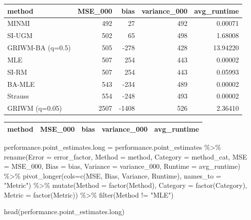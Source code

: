 \documentclass[
]{article}
\newenvironment{Shaded}{\begin{snugshade}}{\end{snugshade}}
\newcommand{\AttributeTok}[1]{\textcolor[rgb]{0.77,0.63,0.00}{#1}}
\newcommand{\FunctionTok}[1]{\textcolor[rgb]{0.00,0.00,0.00}{#1}}
\newcommand{\NormalTok}[1]{#1}
\newcommand{\OtherTok}[1]{\textcolor[rgb]{0.56,0.35,0.01}{#1}}
\newcommand{\SpecialCharTok}[1]{\textcolor[rgb]{0.00,0.00,0.00}{#1}}
\newcommand{\StringTok}[1]{\textcolor[rgb]{0.31,0.60,0.02}{#1}}
\begin{document}
\begin{tabular}{l|r|r|r|r}
\hline
method & MSE\_000 & bias & variance\_000 & avg\_runtime\\
\hline
MINMI & 492 & 27 & 492 & 0.00071\\
\hline
SI-UGM & 502 & 65 & 498 & 1.68008\\
\hline
GRIWM-BA (q=0.5) & 505 & -278 & 428 & 13.94220\\
\hline
MLE & 507 & 254 & 443 & 0.00002\\
\hline
SI-RM & 507 & 254 & 443 & 0.05993\\
\hline
BA-MLE & 543 & -234 & 489 & 0.00002\\
\hline
Strauss & 554 & -248 & 493 & 0.00002\\
\hline
GRIWM (q=0.05) & 2507 & -1408 & 526 & 2.36410\\
\hline
\end{tabular}

\begin{tabular}{l|r|r|r|r}
\hline
method & MSE\_000 & bias & variance\_000 & avg\_runtime\\


\hline
\end{tabular}

\begin{Shaded}
\begin{Highlighting}[]
\NormalTok{performance.point\_estimates.long }\OtherTok{=}\NormalTok{ performance.point\_estimates }\SpecialCharTok{\%\textgreater{}\%}
  \FunctionTok{rename}\NormalTok{(}\AttributeTok{Error =}\NormalTok{ error\_factor,}
         \AttributeTok{Method =}\NormalTok{ method,}
         \AttributeTok{Category =}\NormalTok{ method\_cat,}
         \AttributeTok{MSE =}\NormalTok{ MSE\_000,}
         \AttributeTok{Bias =}\NormalTok{ bias,}
         \AttributeTok{Variance =}\NormalTok{ variance\_000,}
         \AttributeTok{Runtime =}\NormalTok{ avg\_runtime) }\SpecialCharTok{\%\textgreater{}\%}
  \FunctionTok{pivot\_longer}\NormalTok{(}\AttributeTok{cols=}\FunctionTok{c}\NormalTok{(MSE, Bias, Variance, Runtime),}
               \AttributeTok{names\_to =} \StringTok{"Metric"}\NormalTok{) }\SpecialCharTok{\%\textgreater{}\%}
  \FunctionTok{mutate}\NormalTok{(}\AttributeTok{Method =} \FunctionTok{factor}\NormalTok{(Method),}
         \AttributeTok{Category =} \FunctionTok{factor}\NormalTok{(Category),}
         \AttributeTok{Metric =} \FunctionTok{factor}\NormalTok{(Metric)) }\SpecialCharTok{\%\textgreater{}\%}
  \FunctionTok{filter}\NormalTok{(Method }\SpecialCharTok{!=} \StringTok{"MLE"}\NormalTok{)}

\FunctionTok{head}\NormalTok{(performance.point\_estimates.long)}
\end{Highlighting}
\end{Shaded}
\end{document}
